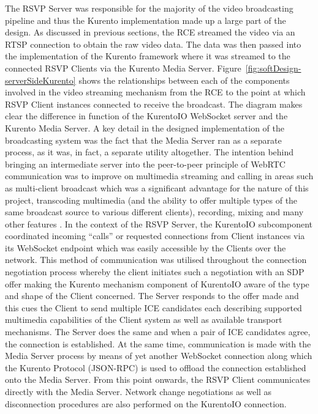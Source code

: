           The RSVP Server was responsible for the majority of the video broadcasting pipeline and thus the Kurento implementation made up a large part of the design. As discussed in previous sections, the RCE streamed the video via an RTSP connection to obtain the raw video data. The data was then passed into the implementation of the Kurento framework where it was streamed to the connected RSVP Clients via the Kurento Media Server. Figure~\ref{fig:softDesign-serverSideKurento} shows the relationships between each of the components involved in the video streaming mechanism from the RCE to the point at which RSVP Client instances connected to receive the broadcast. The diagram makes clear the difference in function of the KurentoIO WebSocket server and the Kurento Media Server. A key detail in the designed implementation of the broadcasting system was the fact that the Media Server ran as a separate process, as it was, in fact, a separate utility altogether. The intention behind bringing an intermediate server into the peer-to-peer principle of WebRTC communication was to improve on multimedia streaming and calling in areas such as multi-client broadcast which was a significant advantage for the nature of this project, transcoding multimedia (and the ability to offer multiple types of the same broadcast source to various different clients), recording, mixing and many other features \cite{kurentoDocsMediaServer_2016}. In the context of the RSVP Server, the KurentoIO subcomponent coordinated incoming ``calls'' or requested connections from Client instances via its WebSocket endpoint which was easily accessible by the Clients over the network. This method of communication was utilised throughout the connection negotiation process whereby the client initiates such a negotiation with an SDP offer making the Kurento mechanism component of KurentoIO aware of the type and shape of the Client concerned. The Server responds to the offer made and this cues the Client to send multiple ICE candidates each describing supported multimedia capabilities of the Client system as well as available transport mechanisms. The Server does the same and when a pair of ICE candidates agree, the connection is established. At the same time, communication is made with the Media Server process by means of yet another WebSocket connection along which the Kurento Protocol (JSON-RPC) is used to offload the connection established onto the Media Server. From this point onwards, the RSVP Client communicates directly with the Media Server. Network change negotiations as well as disconnection procedures are also performed on the KurentoIO connection.
          
